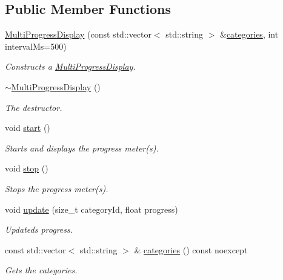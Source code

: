 \subsection*{Public Member Functions}
\begin{DoxyCompactItemize}
\item 
\hyperlink{group___utility_module_ga51c18fad87e104455921392fc91a7c03}{Multi\+Progress\+Display} (const std\+::vector$<$ std\+::string $>$ \&\hyperlink{group___utility_module_ga89b9c96322231a81b2e64f178a8291e3}{categories}, int interval\+Ms=500)
\begin{DoxyCompactList}\small\item\em Constructs a \hyperlink{classdg_1_1deepcore_1_1_multi_progress_display}{Multi\+Progress\+Display}. \end{DoxyCompactList}\item 
\hyperlink{group___utility_module_gae12a350c3384d98843cd2851dcaa10fe}{$\sim$\+Multi\+Progress\+Display} ()
\begin{DoxyCompactList}\small\item\em The destructor. \end{DoxyCompactList}\item 
void \hyperlink{group___utility_module_gaa7547dfd4650dc8a0f761b174ce24450}{start} ()
\begin{DoxyCompactList}\small\item\em Starts and displays the progress meter(s). \end{DoxyCompactList}\item 
void \hyperlink{group___utility_module_ga2f43542bd34ad2f51b7c368d4e94e650}{stop} ()
\begin{DoxyCompactList}\small\item\em Stops the progress meter(s). \end{DoxyCompactList}\item 
void \hyperlink{group___utility_module_gadbcb8e02b7d21ce799baa34e93bc9fee}{update} (size\+\_\+t category\+Id, float progress)
\begin{DoxyCompactList}\small\item\em Updateds progress. \end{DoxyCompactList}\item 
const std\+::vector$<$ std\+::string $>$ \& \hyperlink{group___utility_module_ga89b9c96322231a81b2e64f178a8291e3}{categories} () const noexcept
\begin{DoxyCompactList}\small\item\em Gets the categories. \end{DoxyCompactList}\end{DoxyCompactItemize}
